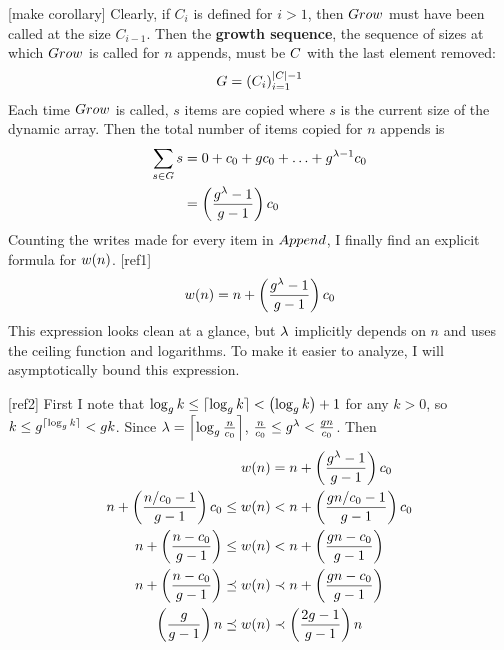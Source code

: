 [make corollary]
Clearly, if $C_i$ is defined for $i > 1$, then $Grow$ must have been called at the size $C_{i - 1}$. Then the \textbf{growth sequence}, the sequence of sizes at which $Grow$ is called for $n$ appends, must be $C$ with the last element removed:
\begin{align*}
G = \left( C_i \right)_{i = 1}^{|C| - 1}
\end{align*}
Each time $Grow$ is called, $s$ items are copied where $s$ is the current size of the dynamic array. Then the total number of items copied for $n$ appends is
\begin{align*}
\sum_{s \in G} s &= 0 + c_0 + gc_0 + \ldots + g^{\lambda - 1}c_0\\
&= \left( \frac{g^{\lambda} - 1}{g - 1} \right) c_0
\end{align*}
Counting the writes made for every item in $Append$, I finally find an explicit formula for $w(n)$.
[ref1]
\begin{align*}
w(n) = n + \left( \frac{g^\lambda - 1}{g - 1} \right) c_0
\end{align*}
This expression looks clean at a glance, but $\lambda$ implicitly depends on $n$ and uses the ceiling function and logarithms. To make it easier to analyze, I will asymptotically bound this expression.

[ref2]
First I note that $\log_{g} k \leq \lceil \log_{g} k \rceil < \left( \log_{g} k \right) + 1$ for any $k > 0$, so $k \leq g^{\lceil \log_{g} k \rceil} < g{k}$. Since $\lambda = \left\lceil \log_{g} \frac{n}{c_0} \right\rceil$, $\frac n {c_0} \leq g^\lambda < \frac {g{n}} {c_0}$. Then
\begin{align*}
w(n) &= n + \left( \frac{g^\lambda - 1}{g - 1} \right) c_0\\
n + \left( \frac{n / c_0 - 1}{g - 1} \right) c_0 \leq w(n) &< n + \left( \frac{g{n} / c_0 - 1}{g - 1} \right) c_0\\
n + \left( \frac{n - c_0}{g - 1} \right) \leq w(n) &< n + \left( \frac{g{n} - c_0}{g - 1} \right)\\
n + \left( \frac{n - c_0}{g - 1} \right) \preceq w(n) &\prec n + \left( \frac{g{n} - c_0}{g - 1} \right)\\
\left( \frac{g}{g - 1} \right) n \preceq w(n) &\prec \left( \frac{2g - 1}{g - 1} \right) n
\end{align*}
\HdrSpaceComplex


